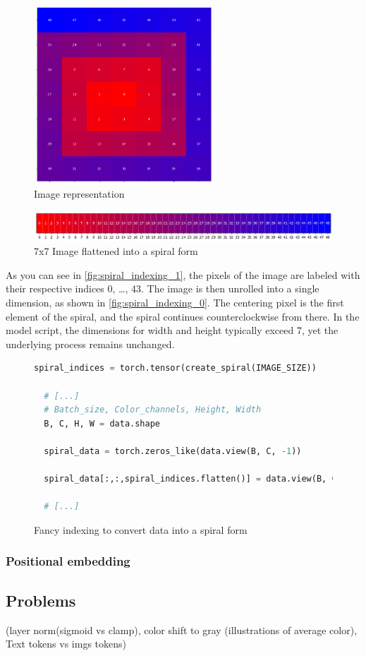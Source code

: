     
    \begin{figure}[H]
    \centering
    \includegraphics[width=0.6\textwidth]{../code/dataAnalysis/plots/exampleImgs/spiralShowcase1.png}
    \caption{Image representation}
    \label{fig:spiral_indexing_1}        
    \end{figure}

    \begin{figure}[H]
    \centering
    \includegraphics[width=1\textwidth]{../code/dataAnalysis/plots/exampleImgs/spiralShowcase0.png}
    \caption{7x7 Image flattened into a spiral form} 
    \label{fig:spiral_indexing_0}        
    \end{figure}

    As you can see in \autoref{fig:spiral_indexing_1}, the pixels of the image are labeled with their respective indices 0, \dots, 43. The image is then unrolled into a single dimension, as shown in \autoref{fig:spiral_indexing_0}. The centering pixel is the first element of the spiral, and the spiral continues counterclockwise from there. In the model script, the dimensions for width and height typically exceed 7, yet the underlying process remains unchanged.

\begin{figure}[H]
\centering
\begin{lstlisting}[language=Python]
  spiral_indices = torch.tensor(create_spiral(IMAGE_SIZE))

  # [...]
  # Batch_size, Color_channels, Height, Width
  B, C, H, W = data.shape

  spiral_data = torch.zeros_like(data.view(B, C, -1))

  spiral_data[:,:,spiral_indices.flatten()] = data.view(B, C, -1)

  # [...]
\end{lstlisting}
\caption{Fancy indexing to convert data into a spiral form}
\label{fig:spiral_indexing_code}
\end{figure}

    \subsubsection{Positional embedding}

\subsection{Problems}
    (layer norm(sigmoid vs clamp), color shift to gray (illustrations of average color), Text tokens vs imgs tokens)